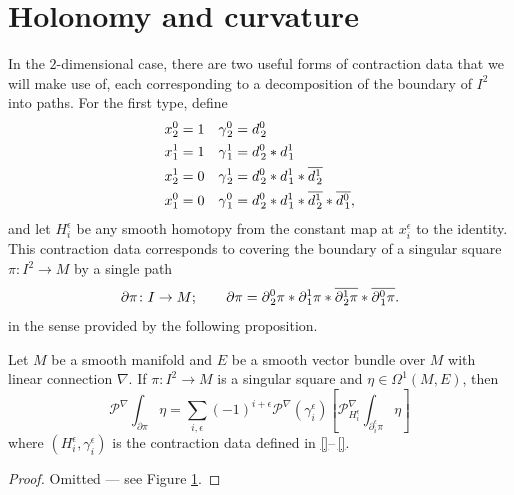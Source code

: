 \section{Holonomy and curvature}

In the $2$-dimensional case, there are two useful forms of contraction data that we will make use of, each corresponding to a decomposition of the boundary of $I^2$ into paths. For the first type, define 
\begin{align}
x_2^0 &= 1 & \gamma_{\mskip 2mu 2}^{0} &= d_{\mskip 2mu 2}^{0} \\
x_1^1 &= 1 &  \gamma_{\mskip 2mu 1}^{1} &= d_{\mskip 2mu 2}^{0} \ast d_{\mskip 1.5mu 1}^{1} \\
x_2^1 &= 0 & \gamma_{\mskip 2mu 2}^{1} &= d_{\mskip 2mu 2}^{0} \ast d_{\mskip 1.5mu 1}^{1} \ast \overline{d_{\mskip 2mu 2}^{1}} \\
x_1^0 &= 0 & \gamma_{\mskip 2mu 1}^{0} &= d_{\mskip 2mu 2}^{0} \ast d_{\mskip 1.5mu 1}^{1} \ast \overline{d_{\mskip 2mu 2}^{1}} \ast \overline{d_{\mskip 2mu 1}^{0}},
\end{align}
and let $H_i^\epsilon$ be any smooth homotopy from the constant map at $x_i^\epsilon$ to the identity. This contraction data corresponds to covering the boundary of a singular square $\pi \colon I^2 \to M$ by a single path
\begin{equation}
  \partial \pi \colon I \to M; \quad \quad \partial \pi = \partial_{\mskip 2mu 2}^{0} \pi \ast \partial_{\mskip 1.5mu  1}^{1} \pi \ast \overline{\partial_{\mskip 1.75mu 2}^{1}\pi} \ast \overline{\partial_{\mskip 2.5mu 1}^{0}\pi}.
\end{equation}
in the sense provided by the following proposition.
\begin{proposition}
  Let $M$ be a smooth manifold and $E$ be a smooth vector bundle over $M$ with linear connection $\nabla$. If $\pi \colon I^2 \to M$ is a singular square and $\eta \in \Omega^{1}(M, E)$, then
  \begin{equation}
    \mathcal{P}^\nabla \!\! \int_{\partial \pi} \eta = \sum_{i, \epsilon} (-1)^{i+\epsilon} \mathcal{P}^\nabla(\gamma_i^\epsilon) \left[\mathcal{P}^\nabla_{H_i^\epsilon} \!\! \int_{\partial_i^\epsilon \pi} \eta \right]
  \end{equation} 
  where $(H_i^\epsilon, \gamma_i^\epsilon)$ is the contraction data defined in \eqref{}--\,\eqref{}.
\end{proposition}
\begin{proof}
  Omitted --- see Figure \ref{}.
\end{proof}

